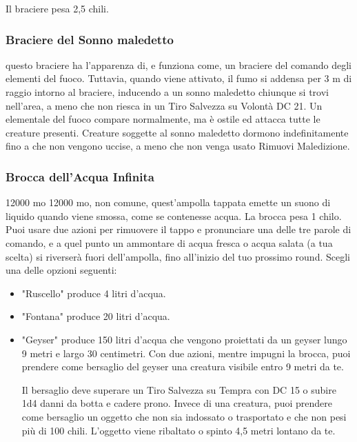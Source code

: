 \begin{multicols}{2}
	Il braciere pesa 2,5 chili.

	\subsubsection*{Braciere del Sonno maledetto}
	questo braciere ha l'apparenza di, e funziona come, un braciere del comando degli elementi del fuoco. Tuttavia, quando viene attivato, il fumo si addensa per 3 m di raggio intorno al braciere, inducendo a un sonno maledetto chiunque si trovi nell'area, a meno che non riesca in un Tiro Salvezza su Volontà DC 21. Un elementale del fuoco compare normalmente, ma è ostile ed attacca tutte le creature presenti. Creature soggette al sonno maledetto dormono indefinitamente fino a che non vengono uccise, a meno che non venga usato Rimuovi Maledizione.

	\subsubsection*{Brocca dell'Acqua Infinita} 12000 mo 12000 mo, non comune, quest'ampolla tappata emette un suono di liquido quando viene smossa, come se contenesse acqua. La brocca pesa 1 chilo. Puoi usare due azioni per rimuovere il tappo e pronunciare una delle tre parole di comando, e a quel punto un ammontare di acqua fresca o acqua salata (a tua scelta) si riverserà fuori dell'ampolla, fino all'inizio del tuo prossimo round. Scegli una delle opzioni seguenti:

	\medskip

	\begin{itemize}
		\item
		"Ruscello" produce 4 litri d'acqua.
		\item
		"Fontana" produce 20 litri d'acqua.
		\item
		"Geyser" produce 150 litri d'acqua che vengono proiettati da un geyser lungo 9 metri e largo 30 centimetri. Con due azioni, mentre impugni la brocca, puoi prendere come bersaglio del geyser una creatura visibile entro 9 metri da te.

		Il bersaglio deve superare un Tiro Salvezza su Tempra con DC 15 o subire 1d4 danni da botta e cadere prono. Invece di una creatura, puoi prendere come bersaglio un oggetto che non sia indossato o trasportato e che non pesi più di 100 chili. L'oggetto viene ribaltato o spinto 4,5 metri lontano da te.
	\end{itemize}


\end{multicols}
